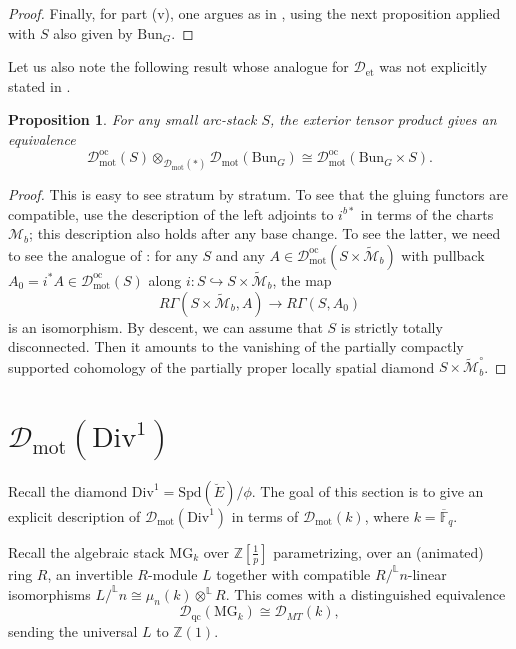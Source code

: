 \documentclass[11pt]{amsart}
\numberwithin{equation}{section}
\numberwithin{theorem}{section}
\newtheorem{proposition}[theorem]{Proposition}
\theoremstyle{definition}
\newcommand{\Bun}{\mathrm{Bun}}
\begin{document}
\begin{proof}
Finally, for part (v), one argues as in \cite[Section V.7]{FarguesScholze}, using the next proposition applied with $S$ also given by $\mathrm{Bun}_G$.
\end{proof}

Let us also note the following result whose analogue for $\mathcal D_{\mathrm{et}}$ was not explicitly stated in \cite{FarguesScholze}.

\begin{proposition}\label{prop:DmotBunGbasechange} For any small arc-stack $S$, the exterior tensor product gives an equivalence
\[
\mathcal D_{\mathrm{mot}}^{\mathrm{oc}}(S)\otimes_{\mathcal D_{\mathrm{mot}}(\ast)} \mathcal D_{\mathrm{mot}}(\Bun_G)\cong \mathcal D_{\mathrm{mot}}^{\mathrm{oc}}(\Bun_G\times S).
\]
\end{proposition}

\begin{proof} This is easy to see stratum by stratum. To see that the gluing functors are compatible, use the description of the left adjoints to $i^{b\ast}$ in terms of the charts $\mathcal M_b$; this description also holds after any base change. To see the latter, we need to see the analogue of \cite[Proposition V.4.2]{FarguesScholze}: for any $S$ and any $A\in \mathcal D_{\mathrm{mot}}^{\mathrm{oc}}(S\times \tilde{\mathcal M}_b)$ with pullback $A_0 = i^\ast A\in \mathcal D_{\mathrm{mot}}^{\mathrm{oc}}(S)$ along $i: S\hookrightarrow S\times \tilde{\mathcal M}_b$, the map
\[
R\Gamma(S\times \tilde{\mathcal M}_b,A)\to R\Gamma(S,A_0)
\]
is an isomorphism. By descent, we can assume that $S$ is strictly totally disconnected. Then it amounts to the vanishing of the partially compactly supported cohomology of the partially proper locally spatial diamond $S\times \tilde{\mathcal M}_b^\circ$.
\end{proof}


\section{$\mathcal D_{\mathrm{mot}}(\mathrm{Div}^1)$}\label{sec:div1}

 Recall the diamond $\mathrm{Div}^1 = \mathrm{Spd}(\breve{E})/\phi$. The goal of this section is to give an explicit description of $\mathcal D_{\mathrm{mot}}(\mathrm{Div}^1)$ in terms of $\mathcal D_{\mathrm{mot}}(k)$, where $k=\overline{\mathbb F}_q$.

Recall the algebraic stack $\mathrm{MG}_k$ over $\mathbb Z[\tfrac 1p]$ parametrizing, over an (animated) ring $R$, an invertible $R$-module $L$ together with compatible $R/^{\mathbb L} n$-linear isomorphisms $L/^{\mathbb L} n\cong \mu_n(k)\otimes^{\mathbb L} R$. This comes with a distinguished equivalence
\[
\mathcal D_{\mathrm{qc}}(\mathrm{MG}_k)\cong \mathcal D_{MT}(k),
\]
sending the universal $L$ to $\mathbb Z(1)$.
\end{document}
